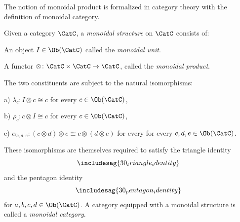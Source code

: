 The notion of monoidal product is formalized in category theory with the definition of monoidal category.
\begin{shaded}
\begin{definition}\label{def:monoidal_cat}
Given a category $\CatC$, a \emph{monoidal structure} on $\CatC$ consists of:
\begin{compactenum}
    \item An object $I\in \Ob(\CatC)$ called the \emph{monoidal unit}.
    \item A functor $\otimes \colon \CatC \times \CatC\to \CatC$, called the \emph{monoidal product}.
\end{compactenum}
The two constituents are subject to the natural isomorphisms:
\begin{compactenum}
    \item[a)] $\lambda_c \colon I\otimes c \cong c$ for every $c\in \Ob(\CatC)$,
    \item[b)] $\rho_c \colon c\otimes I \cong c$ for every $c\in \Ob(\CatC)$,
    \item[c)] $\alpha_{c,d,e}\colon (c\otimes d)\otimes e \cong c\otimes (d\otimes e)$ for every for every $c,d,e\in \Ob(\CatC)$.
\end{compactenum}
These isomorphisms are themselves required to satisfy the triangle identity
\begin{equation}
\includesag{30_triangle_identity}
\end{equation}
and the pentagon identity
\begin{equation}
\includesag{30_pentagon_identity}
\end{equation}
for $a,b,c,d\in \Ob(\CatC)$.
\noindent A category equipped with a monoidal structure is called a \emph{monoidal category}.
\end{definition}
\end{shaded}


